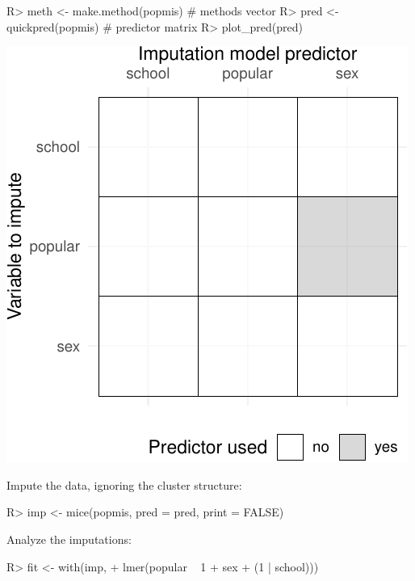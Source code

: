 \documentclass[
]{jss}
\begin{document}
\begin{CodeChunk}
\begin{CodeInput}
R> meth <- make.method(popmis) # methods vector
R> pred <- quickpred(popmis)   # predictor matrix
R> plot_pred(pred)
\end{CodeInput}


\begin{center}\includegraphics{Imputation_of_Incomplete_Multilevel_Data_files/figure-latex/pop-ignored-pred-1} \end{center}

\end{CodeChunk}

Impute the data, ignoring the cluster structure:

\begin{CodeChunk}
\begin{CodeInput}
R> imp <- mice(popmis, pred = pred, print = FALSE)
\end{CodeInput}
\end{CodeChunk}

Analyze the imputations:

\begin{CodeChunk}
\begin{CodeInput}
R> fit <- with(imp, 
+             lmer(popular ~ 1 + sex  + (1 | school))) 
\end{CodeInput}
\end{CodeChunk}
\end{document}
